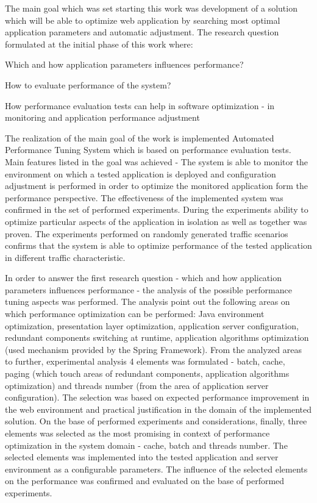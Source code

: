 \documentclass[12pt,a4paper]{article}
\let\tempone\itemize
\let\temptwo\enditemize
\renewenvironment{itemize}{\tempone\addtolength{\itemsep}{-0.4\baselineskip}}{\temptwo}
\begin{document}
The main goal which was set starting this work was development of a solution which will be able to optimize web application by searching most optimal application parameters and automatic adjustment.  The research question formulated at the initial phase of this work where:
\begin{itemize}
\item Which and how application parameters influences performance?
\item How to evaluate performance of the system?
\item How performance evaluation tests can help in software optimization - in monitoring and application performance adjustment
\end{itemize} 

The realization of the main goal of the work is implemented Automated Performance Tuning System which is based on performance evaluation tests. Main features listed in the goal was achieved - The system is able to monitor the environment on which a tested application is deployed and configuration adjustment is performed in order to optimize the monitored application form the performance perspective. The effectiveness of the implemented system was confirmed in the set of performed experiments. During the experiments ability to optimize particular aspects of the application in isolation as well as together was proven. The experiments performed on randomly generated traffic scenarios confirms that the system is able to optimize performance of the tested application in different traffic characteristic.

In order to answer the first research question - which and how application parameters influences performance - the analysis of the possible performance tuning aspects was performed. The analysis point out the following areas on which performance optimization can be performed: Java environment optimization, presentation layer optimization, application server configuration, redundant components switching at runtime, application algorithms  optimization (used mechanism provided by the Spring Framework). From the analyzed areas to further, experimental analysis 4 elements was formulated - batch, cache, paging (which touch areas of redundant components, application algorithms optimization) and threads number (from the area of application server configuration). The selection was based on expected performance improvement in the web environment and practical justification in the domain of the implemented solution. On the base of performed experiments and considerations, finally, three elements was selected as the most promising in context of performance optimization in the system domain - cache, batch and threads number. The selected elements was implemented into the tested application and server environment as a configurable parameters. The influence of the selected elements on the performance was confirmed and evaluated on the base of performed experiments. 
\end{document}
